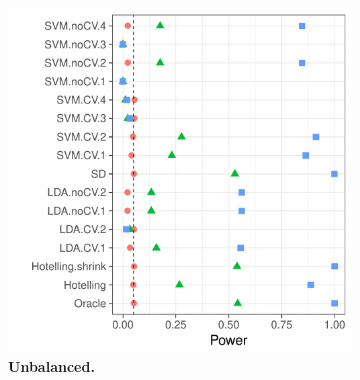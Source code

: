 \documentclass[12pt,a4paper]{article}
\begin{document}
\begin{figure}[h]
	\centering
	\caption{
		The power of a permutation test with various test statistics. 
		The power on the $x$ axis. 
		Effects are color and shape coded. 
		The various statistics on the $y$ axis. 
		Their details are given in Table~\ref{tab:collected}. 
		Effects vary over $0$ (red circle), $0.25$ (green triangle), and $0.5$ (blue square). 
		Simulation details in Section~\ref{apx:simulation_details}.
		Cross-validation was performed with balanced and unbalanced data folding. See sub-captions.}	
	\label{fig:simulation_1}
	\begin{subfigure}{.5\textwidth}
		\centering
		\includegraphics[width=1\linewidth]{"art/file3"}
		\caption{\textbf{Unbalanced.}} %
		\label{fig:simulation_11}
	\end{subfigure}%
	\begin{subfigure}{.5\textwidth}
		\centering

\end{subfigure}
\end{figure}
\end{document}
